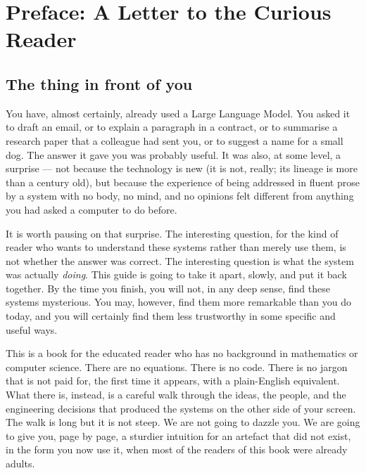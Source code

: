 
\chapter*{Preface: A Letter to the Curious Reader}

\section*{The thing in front of you}

You have, almost certainly, already used a Large Language Model.
You asked it to draft an email, or to explain a paragraph in a
contract, or to summarise a research paper that a colleague had
sent you, or to suggest a name for a small dog. The answer it gave
you was probably useful. It was also, at some level, a surprise ---
not because the technology is new (it is not, really; its lineage
is more than a century old), but because the experience of being
addressed in fluent prose by a system with no body, no mind, and
no opinions felt different from anything you had asked a computer
to do before.

It is worth pausing on that surprise. The interesting question, for
the kind of reader who wants to understand these systems rather
than merely use them, is not whether the answer was correct. The
interesting question is what the system was actually \emph{doing}.
This guide is going to take it apart, slowly, and put it back
together. By the time you finish, you will not, in any deep sense,
find these systems mysterious. You may, however, find them more
remarkable than you do today, and you will certainly find them
less trustworthy in some specific and useful ways.

This is a book for the educated reader who has no background in
mathematics or computer science. There are no equations. There
is no code. There is no jargon that is not paid for, the first
time it appears, with a plain-English equivalent. What there is,
instead, is a careful walk through the ideas, the people, and the
engineering decisions that produced the systems on the other side
of your screen. The walk is long but it is not steep. We are not
going to dazzle you. We are going to give you, page by page, a
sturdier intuition for an artefact that did not exist, in the form
you now use it, when most of the readers of this book were
already adults.

